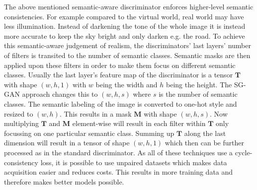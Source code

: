 The above mentioned semantic-aware discriminator enforces higher-level semantic consistencies. For example compared to the virtual world, real world may have less illumination. Instead of darkening the tone of the whole image it is instead more accurate to keep the sky bright and only darken e.g. the road. To achieve this semantic-aware judgement of realism, the discriminators' last layers' number of filters is transited to the number of semantic classes. Semantic masks are then applied upon these filters in order to make them focus on different semantic classes. Usually the last layer's feature map of the discriminator is a tensor $\mathbf{T}$ with shape $(w,h,1)$ with $w$ being the width and $h$ being the height. The SG-GAN approach changes this to $(w,h,s)$ where $s$ is the number of semantic classes. The semantic labeling of the image is converted to one-hot style and resized to $(w,h)$. This results in a mask $\mathbf{M}$ with shape $(w,h,s)$. Now multiplying $\mathbf{T}$ and $\mathbf{M}$ element-wise will result in each filter within $\mathbf{T}$ only focussing on one particular semantic class. Summing up $\mathbf{T}$ along the last dimension will result in a tensor of shape $(w,h,1)$ which then can be further processed as in the standard discriminator. As all of these techniques use a cycle-consistency loss, it is possible to use unpaired datasets which makes data acquisition easier and reduces costs. This results in more training data and therefore makes better models possible. 












